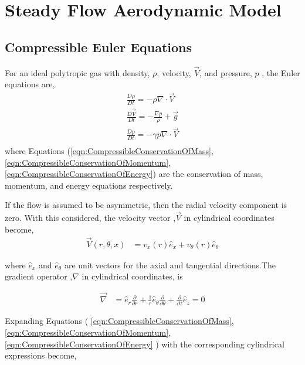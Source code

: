 
\section{Steady Flow Aerodynamic Model}
\subsection{Compressible Euler Equations}

For an ideal polytropic gas with density, $\rho$, velocity, $\vec{V}$, and 
pressure, $p$ , the Euler equations are,
\begin{align}
    \frac{D\rho}{Dt} = - \rho \nabla \cdot \vec{V} 
    \label{eqn:CompressibleConservationOfMass} \\
    \frac{D\vec{V}}{Dt} = - \frac{\nabla p}{\rho} + \vec{g} 
    \label{eqn:CompressibleConservationOfMomentum} \\
    \frac{Dp}{Dt} = - \gamma p \nabla \cdot \vec{V} 
    \label{eqn:CompressibleConservationOfEnergy} \\
\end{align}
where Equations (\ref{eqn:CompressibleConservationOfMass},
\ref{eqn:CompressibleConservationOfMomentum},
\ref{eqn:CompressibleConservationOfEnergy}) are the conservation of mass, 
momentum, and energy equations respectively. 


If the flow is assumed to be asymmetric, then the radial velocity component is 
zero. With this considered, the velocity vector ,$\vec{V}$ in cylindrical coordinates 
become,
\begin{align}
    \vec{V}(r,\theta,x) &= v_x(r) \hat{e}_x + v_{\theta} (r) \hat{e}_{\theta} 
    \label{eqn:VelocityVector}
\end{align}
  
where $\hat{e}_x$ and $\hat{e}_{\theta}$ are unit vectors for the axial and 
tangential directions.The gradient operator ,$\nabla$ in cylindrical
coordinates, is 

\begin{align}
	\vec{\nabla} 
	&= \hat{e}_r \frac{\partial} {\partial r} + 
	\frac{1}{r} \hat{e}_{\theta}   
	\frac{\partial} {\partial \theta} + 
	\frac{\partial }{\partial z} \hat{e}_z = 0
    \label{eqn:NablaInCylindrical}
\end{align}


Expanding Equations
(
\ref{eqn:CompressibleConservationOfMass},
\ref{eqn:CompressibleConservationOfMomentum},
\ref{eqn:CompressibleConservationOfEnergy}
) with the corresponding cylindrical expressions become, 

